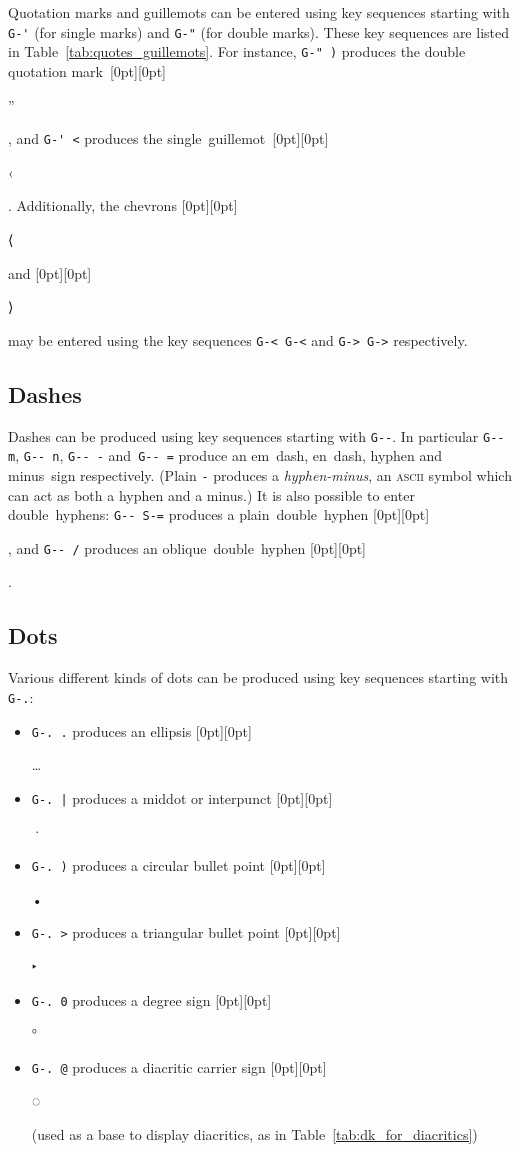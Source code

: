 \documentclass[oneside]{memoir}
\newcommand{\key}{\verb}
\newcommand{\out}[1]{\raisebox{0pt}[0pt][0pt]{\setlength{\fboxsep}{1pt}\colorbox{gray!20}{\strut{}#1}}}
\begin{document}
{{{Quotation marks and guillemots can be entered using key sequences starting with
  \key|G-'| (for single marks) and \key|G-"| (for double marks).
These key sequences are listed in Table~\ref{tab:quotes_guillemots}.
For instance, \key|G-" )| produces the double quotation mark~\out{”}, and \key|G-' <| produces the single~guillemot~\out{‹}.
Additionally, the chevrons \out{⟨} and \out{⟩} may be entered using the key sequences \key|G-< G-<| and \key|G-> G->| respectively.

\subsection{Dashes}
\label{sec:dashes}

Dashes can be produced using key sequences starting with \key|G--|.
In particular \key|G-- m|, \key|G-- n|, \key|G-- -| and~\key|G-- =|
  produce an em~dash, en~dash, hyphen and minus~sign respectively.
(Plain \key|-| produces a \textit{hyphen-minus},
  an \textsc{ascii} symbol which can act as both a hyphen and a minus.)
It is also possible to enter double~hyphens:
  \key|G-- S-=| produces a plain~double~hyphen \out{}, and \key|G-- /| produces an oblique~double~hyphen \out{}.

\subsection{Dots}
\label{sec:dots}

Various different kinds of dots can be produced using key sequences starting with \key|G-.|:

\begin{itemize}[noitemsep]
\item \key|G-. .| produces an ellipsis \out{…}
\item \key!G-. |! produces a middot or interpunct \out{·}
\item \key|G-. )| produces a circular bullet point \out{•}
\item \key|G-. >| produces a triangular bullet point \out{‣}
\item \key|G-. 0| produces a degree sign \out{°}
\item \key|G-. @| produces a diacritic carrier sign \out{◌}
  (used as a base to display diacritics, as in Table~\ref{tab:dk_for_diacritics})
\end{itemize}

}}}
\end{document}
